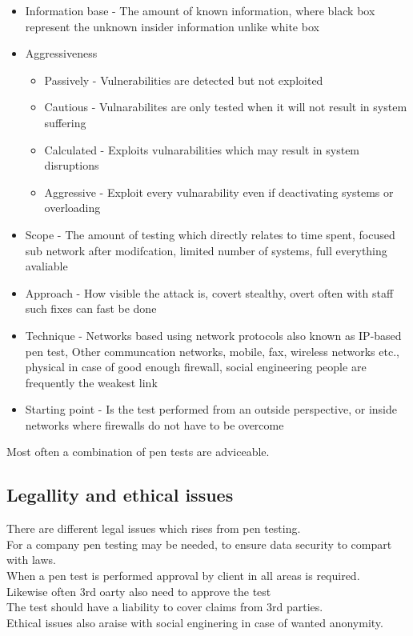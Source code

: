 \documentclass[12pt, a4paper]{article}
\begin{document}
			\begin{itemize}
				\item Information base - The amount of known information, where black box represent the unknown insider information unlike white box
				\item Aggressiveness
				\begin{itemize}
					\item Passively - Vulnerabilities are detected but not exploited
					\item Cautious - Vulnarabilites are only tested when it will not result in system suffering
					\item Calculated - Exploits vulnarabilities which may result in system disruptions
					\item Aggressive - Exploit every vulnarability even if deactivating systems or overloading
				\end{itemize}
				\item Scope - The amount of testing which directly relates to time spent, focused sub network after modifcation, limited number of systems, full everything avaliable
				\item Approach - How visible the attack is, covert stealthy, overt often with staff such fixes can fast be done
				\item Technique - Networks based using network protocols also known as IP-based pen test, Other communcation networks, mobile, fax, wireless networks etc., physical in case of good enough firewall, social engineering people are frequently the weakest link
				\item Starting point - Is the test performed from an outside perspective, or inside networks where firewalls do not have to be overcome
			\end{itemize}
			Most often a combination of pen tests are adviceable.
		\subsection{Legallity and ethical issues}
			There are different legal issues which rises from pen testing.\\
			For a company pen testing may be needed, to ensure data security to compart with laws.\\
			When a pen test is performed approval by client in all areas is required.\\
			Likewise often 3rd oarty also need to approve the test\\
			The test should have a liability to cover claims from 3rd parties.\\
			Ethical issues also araise with social enginering in case of wanted anonymity.	
\end{document}
